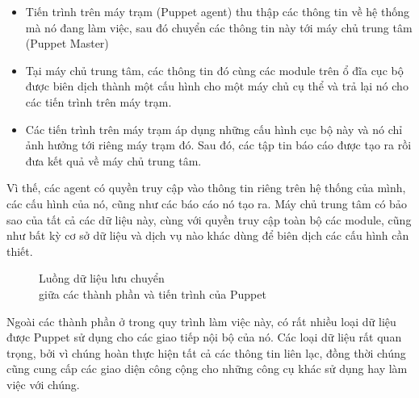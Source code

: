 \begin{itemize}
\item Tiến trình trên máy trạm (Puppet agent) thu thập các thông tin về hệ thống mà nó đang làm việc, sau đó chuyển các thông tin này tới máy chủ trung tâm (Puppet Master)

\item Tại máy chủ trung tâm, các thông tin đó cùng các module trên ổ đĩa cục bộ được biên dịch thành một cấu hình cho một máy chủ cụ thể và trả lại nó cho các tiến trình trên máy trạm.

\item Các tiến trình trên máy trạm áp dụng những cấu hình cục bộ này và nó chỉ ảnh hưởng tới riêng máy trạm đó. Sau đó, các tập tin báo cáo được tạo ra rồi đưa kết quả về máy chủ trung tâm.
\end{itemize}

Vì thế, các agent có quyền truy cập vào thông tin riêng trên hệ thống của mình, các cấu hình của nó, cũng như các báo cáo nó tạo ra. Máy chủ trung tâm có bảo sao của tất cả các dữ liệu này, cùng với quyền truy cập toàn bộ các module, cũng như bất kỳ cơ sở dữ liệu và dịch vụ nào khác dùng để biên dịch các cấu hình cần thiết.

\begin{figure}[h!]
    \begin{center}
    \end{center}
    \caption{Luồng dữ liệu lưu chuyển \\ giữa các thành phần và tiến trình của Puppet}
    \label{fig:puppet_timing_diagram}
\end{figure}

Ngoài các thành phần ở trong quy trình làm việc này, có rất nhiều loại dữ liệu được Puppet sử dụng cho các giao tiếp nội bộ của nó. Các loại dữ liệu rất quan trọng, bởi vì chúng hoàn thực hiện tất cả các thông tin liên lạc, đồng thời chúng cũng cung cấp các giao diện công cộng cho những công cụ khác sử dụng hay làm việc với chúng.


